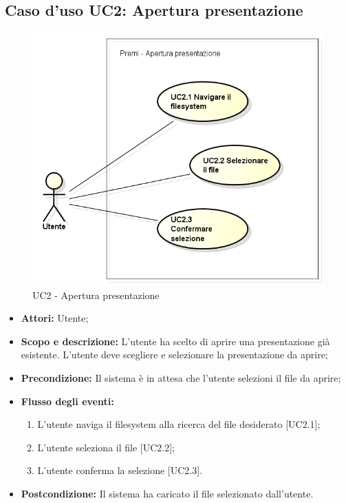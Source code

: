 \subsection{Caso d'uso UC2: Apertura presentazione}
\begin{figure}[h] 
	\centering 
	\includegraphics[scale=0.45] {img/UC2.png} 
	\caption{UC2 - Apertura presentazione} 
\end{figure}

\begin{itemize}
	\item \textbf{Attori:} Utente;
	\item \textbf{Scopo e descrizione:} L'utente ha scelto di aprire una presentazione già esistente. L'utente deve scegliere e selezionare la presentazione da aprire;
	\item \textbf{Precondizione:} Il sistema è in attesa che l'utente selezioni il file da aprire;
	\item \textbf{Flusso degli eventi:}
	\begin{enumerate}
		\item L'utente naviga il \gls{filesystem} alla ricerca del file desiderato [UC2.1];
		\item L'utente seleziona il file [UC2.2];
		\item L'utente conferma la selezione [UC2.3].
	\end{enumerate}
	\item \textbf{Postcondizione:} Il sistema ha caricato il file selezionato dall'utente.
\end{itemize}

